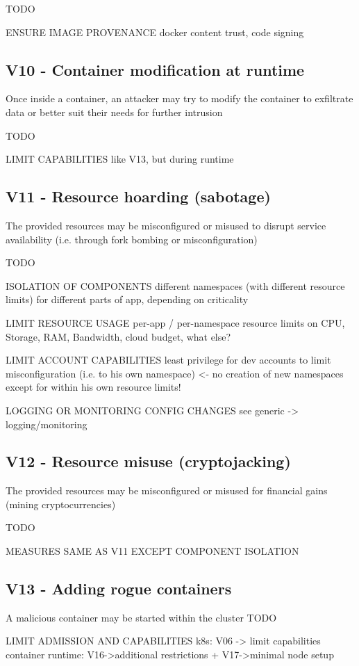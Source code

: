 TODO

ENSURE IMAGE PROVENANCE
	docker content trust, code signing


\subsection{V10 - Container modification at runtime}
Once inside a container, an attacker may try to modify the container to exfiltrate data or better suit their needs for further intrusion

TODO

LIMIT CAPABILITIES
	like V13, but during runtime

\subsection{V11 - Resource hoarding (sabotage)}
The provided resources may be misconfigured or misused to disrupt service availability (i.e. through fork bombing or misconfiguration)

TODO

ISOLATION OF COMPONENTS
	different namespaces (with different resource limits) for different parts of app, depending on criticality
	
LIMIT RESOURCE USAGE
	per-app / per-namespace resource limits on CPU, Storage, RAM, Bandwidth, cloud budget, what else?
	
LIMIT ACCOUNT CAPABILITIES
	least privilege for dev accounts to limit misconfiguration (i.e. to his own namespace) <- no creation of new namespaces except for within his own resource limits!
	
LOGGING OR MONITORING CONFIG CHANGES
	see generic -> logging/monitoring

\subsection{V12 - Resource misuse (cryptojacking)}
The provided resources may be misconfigured or misused for financial gains (mining cryptocurrencies)

TODO

MEASURES SAME AS V11 EXCEPT COMPONENT ISOLATION

\subsection{V13 - Adding rogue containers}
A malicious container may be started within the cluster
TODO

LIMIT ADMISSION AND CAPABILITIES
	k8s: V06 -> limit capabilities
	container runtime: V16->additional restrictions + V17->minimal node setup


